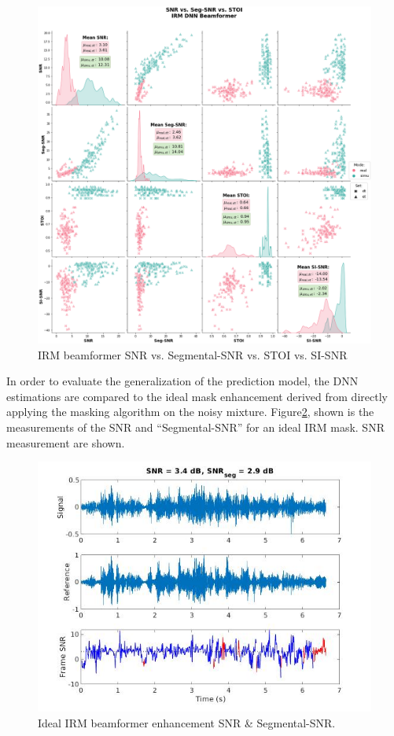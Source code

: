 \begin{figure}[H]
    \centering
    \includegraphics[width=\linewidth]{Features/images/irm_snr_stoi}
    \caption{IRM beamformer SNR vs. Segmental-SNR vs. STOI vs. SI-SNR}\label{fig:irm_snr_stoi}
\end{figure}

In order to evaluate the generalization of the prediction model,
the DNN estimations are compared to the ideal mask enhancement derived from
directly applying the masking algorithm on the noisy mixture.
Figure\;\ref{fig:irm_ideal_snr}, shown is the measurements of 
the SNR and ``Segmental-SNR'' for an ideal IRM mask.
SNR measurement are shown.

\begin{figure}[H]
    \centering
    \includegraphics[width=\linewidth]{Features/images/irm_ideal_snr}
    \caption{Ideal IRM beamformer enhancement SNR \& Segmental-SNR.}\label{fig:irm_ideal_snr}
\end{figure}




